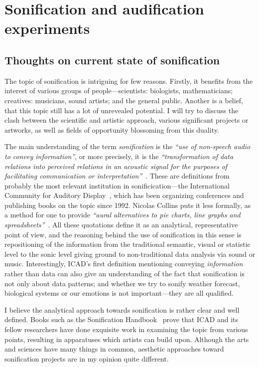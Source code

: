 \documentclass[12pt,a4paper,oneside]{report}
\begin{document}

\chapter{Sonification and audification experiments}

\section{Thoughts on current state of sonification}

The topic of sonification is intriguing for few reasons. Firstly, it benefits from the interest of various groups of people---scientists: biologists, mathematicians; creatives: musicians, sound artists; and the general public. Another is a belief, that this topic still has a lot of unrevealed potential. I will try to discuss the clash between the scientific and artistic approach, various significant projects or artworks, as well as fields of opportunity blossoming from this duality.

The main understanding of the term \emph{sonification} is the \emph{``use of non-speech audio to convey information''}, or more precisely, it is the \emph{``transformation of data relations into perceived relations in an acoustic signal for the purposes of facilitating communication or interpretation''}~\cite[p.~1]{Fitch}. These are definitions from probably the most relevant institution in sonificication---the International Community for Auditory Display~\cite{icad}, which has been organizing conferences and publishing books on the topic since 1992. Nicolas Collins puts it less formally, as a method for one to provide \emph{``aural alternatives to pie charts, line graphs and spreadsheets''}~\cite[p.~7]{Collins2006}. All these quotations define it as an analytical, representative point of view, and the reasoning behind the use of sonification in this sense is repositioning of the information from the traditional semantic, visual or statistic level to the sonic level giving ground to non-traditional data analysis via sound or music. Interestingly, ICAD's first definition mentioning conveying \emph{information} rather than data can also give an understanding of the fact that sonification is not only about data patterns; and whether we try to sonify weather forecast, biological systems or our emotions is not important---they are all qualified.

I believe the analytical approach towards sonification is rather clear and well defined. Books such as the Sonification Handbook~\cite{Hermann2011} prove that ICAD and its fellow researchers have done exquisite work in examining the topic from various points, resulting in apparatuses which artists can build upon. Although the arts and sciences have many things in common, aesthetic approaches toward sonification projects are in my opinion quite different.
\end{document}
